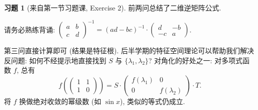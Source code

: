 \documentclass[11pt]{ctexart}
\theoremstyle{definition}
\numberwithin{equation}{section}
\theoremstyle{definition}
\newtheorem*{exercise}{习题}
\theoremstyle{remark}
\begin{document}
\begin{exercise}[来自第一节习题课, Exercise 2]
    前两问总结了二维逆矩阵公式. 
    \begin{pinked}
        请务必熟练背诵: $\begin{pmatrix}
            a & b\\
            c & d
            \end{pmatrix}^{-1} =( ad-bc)^{-1} \cdotp \begin{pmatrix}
            d & -b\\
            -c & a
            \end{pmatrix}$. 
    \end{pinked}
    第三问直接计算即可 (结果是特征根). 后半学期的特征空间理论可以帮助我们解决反问题: 如何不经提示地直接找到 $S$ 与 $\{\lambda_1,\lambda_2\}$? 对角化的好处之一: 对多项式函数 $f$, 总有
    \begin{equation}
        f\left(\begin{pmatrix}
            1&1\\1&0
        \end{pmatrix}\right)= S\cdot \begin{pmatrix}
            f(\lambda_1)&0\\0&f(\lambda_2)
        \end{pmatrix}\cdot T.
    \end{equation}
    将 $f$ 换做绝对收敛的幂级数 (如 $\sin x$), 类似的等式仍成立. 
\end{exercise}
\end{document}
